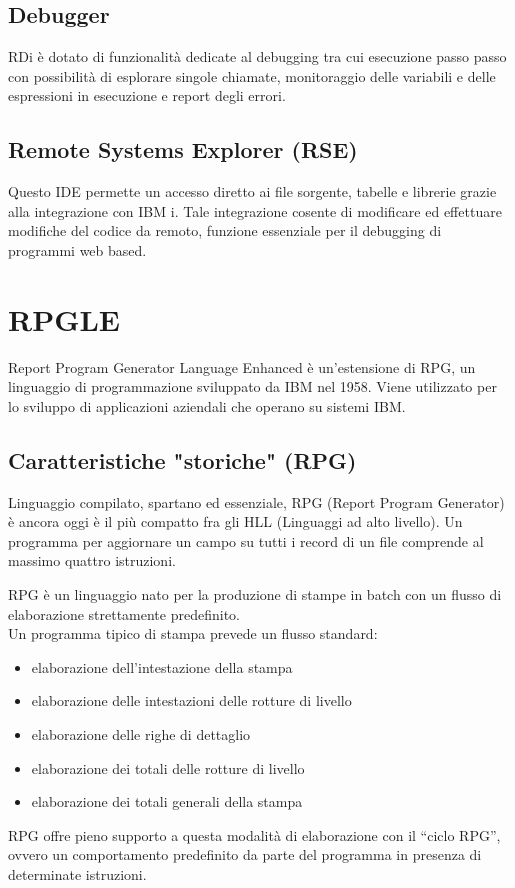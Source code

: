 \documentclass[target=bach,aauheader=,style=]{thud}
\begin{document}
\subsection{Debugger}
RDi è dotato di funzionalità dedicate al debugging tra cui esecuzione passo passo con possibilità di esplorare singole chiamate, monitoraggio delle variabili e delle espressioni in esecuzione e report degli errori.


\subsection{Remote Systems Explorer (RSE)}
Questo IDE permette un accesso diretto ai file sorgente, tabelle e librerie grazie alla integrazione con IBM i.
Tale integrazione cosente di modificare ed effettuare modifiche del codice da remoto, funzione essenziale per il debugging di programmi web based.



\section{RPGLE}
Report Program Generator Language Enhanced è un'estensione di RPG, un linguaggio di programmazione sviluppato da IBM nel 1958.
Viene utilizzato per lo sviluppo di applicazioni aziendali che operano su sistemi IBM.

\subsection{Caratteristiche "storiche" (RPG)}
Linguaggio compilato, spartano ed essenziale, RPG (Report Program Generator) è ancora oggi è il più compatto fra gli HLL (Linguaggi ad alto livello).
Un programma per aggiornare un campo su tutti i record di un file comprende al massimo quattro istruzioni.

RPG è un linguaggio nato per la produzione di stampe in batch con un flusso di elaborazione strettamente predefinito.
\\
Un programma tipico di stampa prevede un flusso standard:
\begin{itemize}
    \setlength{\itemsep}{0pt} %
    \item elaborazione dell’intestazione della stampa
    \item elaborazione delle intestazioni delle rotture di livello
    \item elaborazione delle righe di dettaglio
    \item elaborazione dei totali delle rotture di livello
    \item elaborazione dei totali generali della stampa
\end{itemize}
RPG offre pieno supporto a questa modalità di
elaborazione con il “ciclo RPG”, ovvero un comportamento
predefinito da parte del programma in presenza di
determinate istruzioni.
\end{document}
